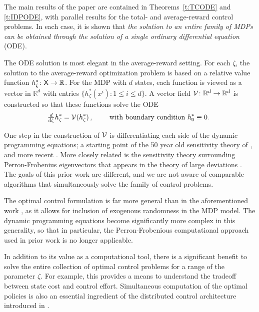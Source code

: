 \documentclass[final,12pt]{colt2018} %
\def\state{{\sf X}}
\def\stateu{{\sf X}_{\sf u}}
\newcommand{\field}[1]{\mathbb{#1}}
\def\Re{\field{R}}
\def\clV{{\cal V}}
\def\FRAC#1#2#3{\genfrac{}{}{}{#1}{#2}{#3}}
\def\ddzeta{{\mathchoice{\FRAC{1}{d}{d\zeta}}%
{\FRAC{1}{d}{d\zeta}}%
{\FRAC{3}{d}{d\zeta}}%
{\FRAC{3}{d}{d\zeta}}}}
\def\Re{\field{R}}
\begin{document}
The main results of the paper are contained in Theorems~\ref{t:TCODE}  and \ref{t:IDPODE}, 
with parallel results for the total- and average-reward control problems.   In each case, it is shown that   \textit{the solution to an entire family of MDPs can be obtained through the solution of a single ordinary differential equation} (ODE).   

The ODE solution is most elegant in the average-reward setting.  For each $\zeta$, the solution to the average-reward optimization problem is based on a relative value function $h^*_\zeta\colon\state\to\Re$.  For the MDP with $d$ states, each function is viewed as a vector in $\Re^d$ with entries $\{h_\zeta^*(x^i) : 1\le i\le d\}$.  A vector field $\clV\colon\Re^d\to\Re^d$ is constructed so that these functions solve the ODE 
\[
\ddzeta h^*_\zeta  =  \clV(h^*_\zeta)\,,
\qquad\text{
with boundary condition $h^*_0\equiv 0$.
 }
 \]

One step in the construction of $\clV$ is differentiating each side of the dynamic programming equations; a starting point of the 50 year old sensitivity theory of  \cite{sch68}, and  more recent \cite{sutmcasinman99}.
  More closely related is the sensitivity theory surrounding Perron-Frobenius eigenvectors that appears in the theory of large deviations \cite[Prop.~4.9]{konmey03a}.
 The goals of this prior work are different, and we are not aware of comparable algorithms that simultaneously solve the family of control problems.

  The optimal control formulation is far more general than in the aforementioned work \cite{tod07,guaragwil14,meybarbusyueehr15}, as it allows for inclusion of exogenous randomness in the MDP model.   The dynamic programming equations become significantly  more complex in this generality, so that in particular, the Perron-Frobenious computational approach used in  prior work is no longer applicable.   
 



 

In addition to its value as a computational tool,  there is a significant benefit to solve the entire collection of optimal control problems for a range of the parameter $\zeta$.  For example, this provides a means to understand the tradeoff between state cost and control effort.     Simultaneous computation of the optimal policies is also an essential ingredient of the distributed control architecture introduced in  \cite{meybarbusyueehr15}.   
\end{document}
